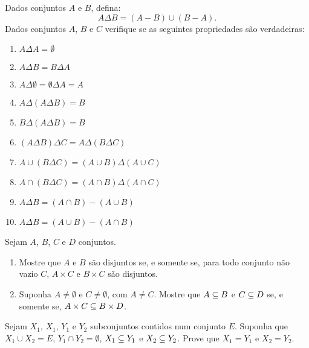 \documentclass[12pt]{exam}
\begin{document}
\questao{}Dados conjuntos $A$ e $B$, defina:
\[
	A \Delta B = (A - B) \cup (B - A).
\]
Dados conjuntos $A$, $B$ e $C$ verifique se as seguintes propriedades são verdadeiras:
\begin{enumerate}
	\item $A \Delta A = \emptyset$
	\item $A \Delta B = B \Delta A$
	\item $A \Delta \emptyset = \emptyset \Delta A = A$
	\item $A \Delta (A \Delta B) = B$
	\item $B \Delta (A \Delta B) = B$
	\item $(A \Delta B) \Delta C = A \Delta (B \Delta C)$
	\item $A \cup (B \Delta C) = (A \cup B) \Delta (A \cup C)$
	\item $A \cap (B \Delta C) = (A \cap B) \Delta (A \cap C)$
	\item $A \Delta B = (A \cap B) - (A \cup B)$
	\item $A \Delta B = (A \cup B) - (A \cap B)$
\end{enumerate}

\questao{} Sejam $A$, $B$, $C$ e $D$ conjuntos.
\begin{enumerate}[label={\alph*})]
	\item Mostre que $A$ e $B$ s\~ao disjuntos se, e somente se, para todo conjunto n\~ao vazio $C$, $A \times C$ e $B \times C$ s\~ao disjuntos.
	\item Suponha $A \ne \emptyset$ e $C \ne \emptyset$, com $A \ne C$. Mostre que $A \subseteq B$ e $C \subseteq D$ se, e somente se, $A \times C \subseteq B \times D$.
\end{enumerate}

\vspace{.3cm}

\questao{} Sejam $X_1$, $X_1$, $Y_1$ e $Y_2$ subconjuntos contidos num conjunto $E$. Suponha que $X_1 \cup X_2 = E$, $Y_1 \cap Y_2 = \emptyset$, $X_1 \subseteq Y_1$ e $X_2 \subseteq Y_2$. Prove que $X_1 = Y_1$ e $X_2 = Y_2$.
\end{document}
